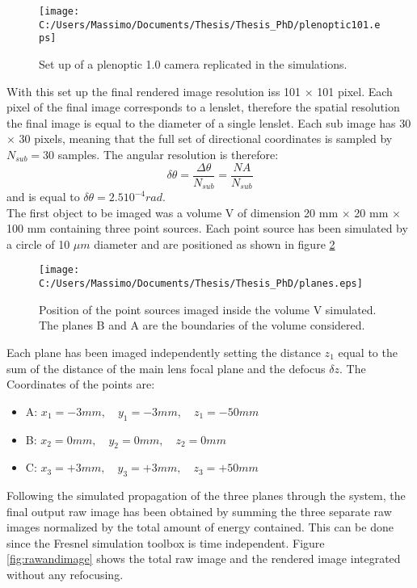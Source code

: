 \begin{figure}[H]
	\centering
	\texttt{[image: C:/Users/Massimo/Documents/Thesis/Thesis\_PhD/plenoptic101.eps]}
	\caption{\label{fig:pleno10_system2} Set up of a plenoptic 1.0 camera replicated in the simulations. }
\end{figure}		
With this set up the final rendered image resolution iss 101 $\times$ 101 pixel. Each pixel of the final image corresponds to a lenslet, therefore the spatial resolution the final image is equal to the diameter of a single lenslet. Each sub image has 30 $\times$ 30 pixels, meaning that the full set of directional coordinates is sampled by $N_{sub}=30$ samples. The angular resolution is therefore:
\begin{equation}
\label{eq:angularres}
\delta\theta = \dfrac{\Delta\theta}{N_{sub}}=\dfrac{NA}{N_{sub}}
\end{equation}
and is equal to $\delta\theta = 2.5 10^{-4} rad$.\\
The first object to be imaged was a volume V of dimension 20 mm $\times$ 20 mm $\times$ 100 mm containing three point sources. Each point source has been simulated by a circle of 10 $\mu m$ diameter and are positioned as shown in figure \ref{fig:volumepoint}
\begin{figure}[H]
	\centering
	\texttt{[image: C:/Users/Massimo/Documents/Thesis/Thesis\_PhD/planes.eps]}
	\caption{\label{fig:volumepoint} Position of the point sources imaged inside the volume V simulated. The planes B and A are the boundaries of the volume considered. }
\end{figure}
Each plane has been imaged independently setting the distance $z_1$ equal to the sum of the distance of the main lens focal plane and the defocus $\delta z$. The Coordinates of the points are: 
\begin{itemize}
	\item A: $x_1 = -3 mm , \quad y_1 = -3 mm , \quad z_1 = -50 mm$
	\item B: $x_2 = 0 mm, \quad y_2 = 0 mm, \quad z_2 = 0 mm$ 
	\item C: $x_3 = +3 mm , \quad y_3 = +3 mm, \quad z_3 = +50 mm$
	\end{itemize} 
Following the simulated propagation of the three planes through the system, the final output raw image has been obtained by summing the three separate raw images normalized by the total amount of energy contained. This can be done since the Fresnel simulation toolbox is time independent. Figure \ref{fig:rawandimage} shows the total raw image and the rendered image integrated without any refocusing.
